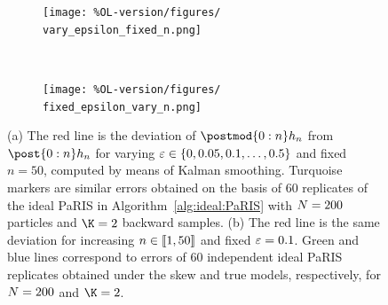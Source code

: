 \begin{figure}
    \centering
    \begin{subfigure}[b]{0.45\textwidth}
        \texttt{[image: \%OL-version/figures/
        vary\_epsilon\_fixed\_n.png]}
        \caption{}
        \label{fig:varying:precpar}
    \end{subfigure}
    ~ 
    \begin{subfigure}[b]{0.45\textwidth}
        \texttt{[image: \%OL-version/figures/
        fixed\_epsilon\_vary\_n.png]}
        \caption{}
        \label{fig:varying:n}
    \end{subfigure}
    \caption{(a) The red line is the deviation of $\postmod{0:n} h_n$ from $\post{0:n} h_n$ for varying $\varepsilon \in \{0, 0.05, 0.1, \ldots, 0.5 \}$ and fixed $n = 50$, computed by means of Kalman smoothing. Turquoise markers are similar errors obtained on the basis of $60$ replicates of the ideal PaRIS in Algorithm~\ref{alg:ideal:PaRIS} with $N = 200$ particles and $\K = 2$ backward samples. (b) The red line is the same deviation for increasing $n \in \llbracket 1, 50 \rrbracket$ and fixed $\varepsilon = 0.1$. Green and blue lines correspond to errors of $60$ independent ideal PaRIS replicates obtained under the skew and true models, respectively, for $N = 200$ and $\K = 2$.} \label{fig}
\end{figure}

